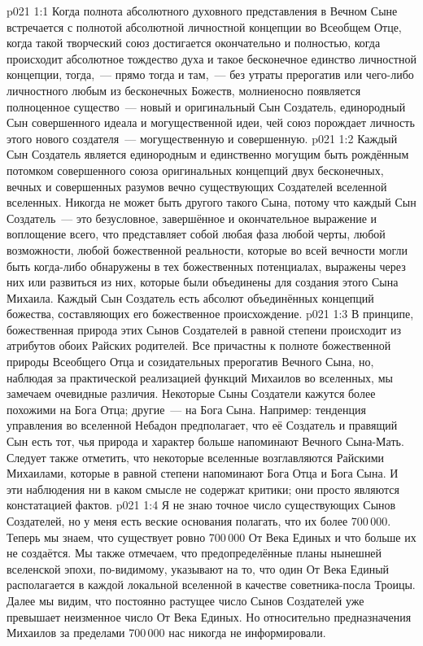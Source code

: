 \vs p021 1:1 Когда полнота абсолютного духовного представления в Вечном Сыне встречается с полнотой абсолютной личностной концепции во Всеобщем Отце, когда такой творческий союз достигается окончательно и полностью, когда происходит абсолютное тождество духа и такое бесконечное единство личностной концепции, тогда,~--- прямо тогда и там,~--- без утраты прерогатив или чего\hyp{}либо личностного любым из бесконечных Божеств, молниеносно появляется полноценное существо~--- новый и оригинальный Сын Создатель, единородный Сын совершенного идеала и могущественной идеи, чей союз порождает личность этого нового создателя~--- могущественную и совершенную.
\vs p021 1:2 Каждый Сын Создатель является единородным и единственно могущим быть рождённым потомком совершенного союза оригинальных концепций двух бесконечных, вечных и совершенных разумов вечно существующих Создателей вселенной вселенных. Никогда не может быть другого такого Сына, потому что каждый Сын Создатель~--- это безусловное, завершённое и окончательное выражение и воплощение всего, что представляет собой любая фаза любой черты, любой возможности, любой божественной реальности, которые во всей вечности могли быть когда\hyp{}либо обнаружены в тех божественных потенциалах, выражены через них или развиться из них, которые были объединены для создания этого Сына Михаила. Каждый Сын Создатель есть абсолют объединённых концепций божества, составляющих его божественное происхождение.
\vs p021 1:3 В принципе, божественная природа этих Сынов Создателей в равной степени происходит из атрибутов обоих Райских родителей. Все причастны к полноте божественной природы Всеобщего Отца и созидательных прерогатив Вечного Сына, но, наблюдая за практической реализацией функций Михаилов во вселенных, мы замечаем очевидные различия. Некоторые Сыны Создатели кажутся более похожими на Бога Отца; другие~--- на Бога Сына. Например: тенденция управления во вселенной Небадон предполагает, что её Создатель и правящий Сын есть тот, чья природа и характер больше напоминают Вечного Сына\hyp{}Мать. Следует также отметить, что некоторые вселенные возглавляются Райскими Михаилами, которые в равной степени напоминают Бога Отца и Бога Сына. И эти наблюдения ни в каком смысле не содержат критики; они просто являются констатацией фактов.
\vs p021 1:4 Я не знаю точное число существующих Сынов Создателей, но у меня есть веские основания полагать, что их более 700\,000. Теперь мы знаем, что существует ровно 700\,000 От Века Единых и что больше их не создаётся. Мы также отмечаем, что предопределённые планы нынешней вселенской эпохи, по\hyp{}видимому, указывают на то, что один От Века Единый располагается в каждой локальной вселенной в качестве советника\hyp{}посла Троицы. Далее мы видим, что постоянно растущее число Сынов Создателей уже превышает неизменное число От Века Единых. Но относительно предназначения Михаилов за пределами 700\,000 нас никогда не информировали.
